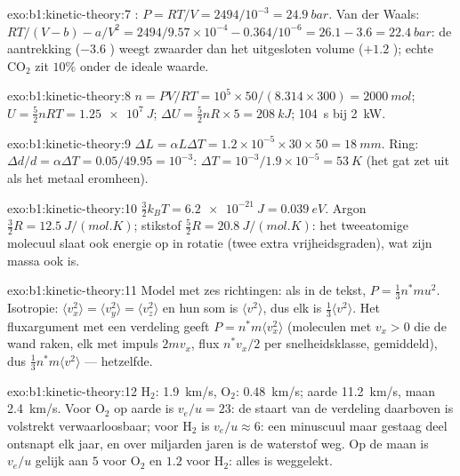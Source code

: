 \begin{solution}{exo:b1:kinetic-theory:7}
: $P = RT/V = 2494/10^{-3} = \qty{24.9}{bar}$. Van der Waals:
$RT/(V - b) - a/V^2 = 2494/9.57\times10^{-4} - 0.364/10^{-6} = 26.1 - 3.6 =
\qty{22.4}{bar}$: de aantrekking ($-3.6$ ) weegt zwaarder dan het uitgesloten
volume ($+1.2$ ); echte CO$_2$ zit $10\%$ onder de ideale waarde.
\end{solution}

\begin{solution}{exo:b1:kinetic-theory:8}
$n = PV/RT = 10^5 \times 50/(8.314 \times 300) = \qty{2000}{mol}$; $U = \tfrac52
nRT = \qty{1.25e7}{J}$; $\Delta U = \tfrac52 nR \times 5 = \qty{208}{kJ}$;
\qty{104}{s} bij \qty{2}{kW}.
\end{solution}

\begin{solution}{exo:b1:kinetic-theory:9}
$\Delta L = \alpha L\Delta T = 1.2\times10^{-5} \times 30 \times 50 = \qty{18}{mm}$.
Ring: $\Delta d/d = \alpha\Delta T = 0.05/49.95 = 10^{-3}$: $\Delta T = 10^{-3}/
1.9\times10^{-5} = \qty{53}{K}$ (het gat zet uit als het metaal eromheen).
\end{solution}

\begin{solution}{exo:b1:kinetic-theory:10}
$\tfrac32 k_BT = \qty{6.2e-21}{J} = \qty{0.039}{eV}$. Argon $\tfrac32 R =
\qty{12.5}{J/(mol.K)}$; stikstof $\tfrac52 R = \qty{20.8}{J/(mol.K)}$: het
tweeatomige molecuul slaat ook energie op in rotatie (twee extra
vrijheidsgraden), wat zijn massa ook is.
\end{solution}

\begin{solution}{exo:b1:kinetic-theory:11}
Model met zes richtingen: als in de tekst, $P = \tfrac13 n^*mu^2$. Isotropie:
$\langle v_x^2\rangle = \langle v_y^2\rangle = \langle v_z^2\rangle$ en hun
som is $\langle v^2\rangle$, dus elk is $\tfrac13\langle v^2\rangle$. Het
fluxargument met een verdeling geeft $P = n^*m\langle v_x^2\rangle$ (moleculen
met $v_x > 0$ die de wand raken, elk met impuls $2mv_x$, flux $n^*v_x/2$ per
snelheidsklasse, gemiddeld), dus $\tfrac13 n^*m\langle v^2\rangle$ --- hetzelfde.
\end{solution}

\begin{solution}{exo:b1:kinetic-theory:12}
H$_2$: \qty{1.9}{km/s}, O$_2$: \qty{0.48}{km/s}; aarde \qty{11.2}{km/s}, maan
\qty{2.4}{km/s}. Voor O$_2$ op aarde is $v_e/u = 23$: de staart van de
verdeling daarboven is volstrekt verwaarloosbaar; voor H$_2$ is $v_e/u \approx 6$:
een minuscuul maar gestaag deel ontsnapt elk jaar, en over miljarden
jaren is de waterstof weg. Op de maan is $v_e/u$ gelijk aan $5$ voor O$_2$ en
$1.2$ voor H$_2$: alles is weggelekt.
\end{solution}

